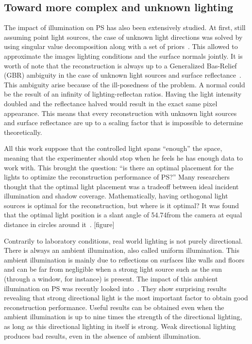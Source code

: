 \subsection{Toward more complex and unknown lighting}
The impact of illumination on PS has also been extensively studied. At first, still assuming point light sources, the case of unknown light directions was solved by using singular value decomposition along with a set of priors~\cite{Hayakawa1994}. This allowed to approximate the images lighting conditions and the surface normals jointly. It is worth of note that the reconstruction is always up to a Generalized Bas-Relief (GBR) ambiguity in the case of unknown light sources and surface reflectance~\cite{Belhumeur1999}. This ambiguity arise because of the ill-posedness of the problem. A normal could be the result of an infinity of lighting-reflectan ratios. Having the light intensity doubled and the reflectance halved would result in the exact same pixel appearance. This means that every reconstruction with unknown light sources and surface reflectance are up to a scaling factor that is impossible to determine theoretically.

All this work suppose that the controlled light spans ``enough'' the space, meaning that the experimenter should stop when he feels he has enough data to work with. This brought the question: ``is there an optimal placement for the lights to optimize the reconstruction performance of PS?'' Many researchers thought that the optimal light placement was a tradeoff between ideal incident illumination and shadow coverage. Mathematically, having orthogonal light sources is optimal for the reconstruction, but where is it optimal? It was found that the optimal light position is a slant angle of 54.74\degree from the camera at equal distance in circles around it~\cite{spence-iwtas-03,drbohlav-iccv-05}. [figure]

Contrarily to laboratory conditions, real world lighting is not purely directional. There is always an ambient illumination, also called uniform illumination. This ambient illumination is mainly due to reflections on surfaces like walls and floors and can be far from negligible when a strong light source such as the sun (through a window, for instance) is present. The impact of this ambient illumination on PS was recently looked into~\cite{Angelopoulou2013}. They show surprising results revealing that strong directional light is the most important factor to obtain good reconstruction performance. Useful results can be obtained even when the ambient illumination is up to nine times the strength of the directional lighting, as long as this directional lighting in itself is strong. Weak directional lighting produces bad results, even in the absence of ambient illumination.

